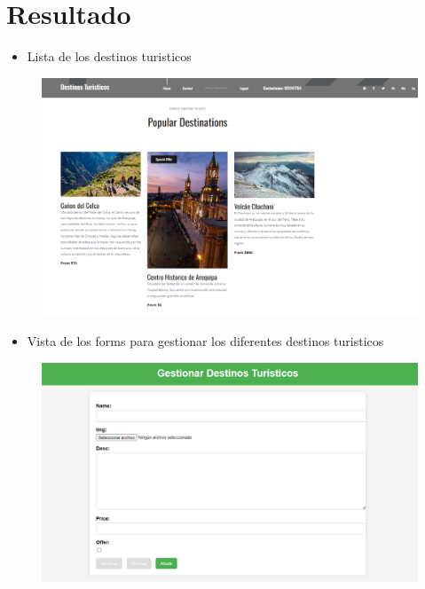 \documentclass{article}
\begin{document}
\section {Resultado}
	\begin{itemize}
		\item Lista de los destinos turisticos
	\end{itemize}	
	\begin{figure}[H]
		\centering
		\includegraphics[width=1.0\textwidth,keepaspectratio]{img/Vista1.png}
	\end{figure}
	\begin{itemize}
		\item Vista de los forms para gestionar los diferentes destinos turisticos
	\end{itemize}	
	\begin{figure}[H]
		\centering
		\includegraphics[width=1.0\textwidth,keepaspectratio]{img/Vista3.png}
	\end{figure}
\end{document}
